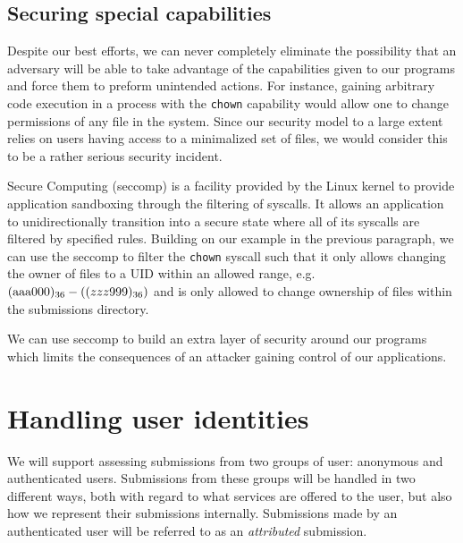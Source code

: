 \subsection{Securing special capabilities}
Despite our best efforts, we can never completely eliminate the
possibility that an adversary will be able to take advantage of the
capabilities given to our programs and force them to preform
unintended actions. For instance, gaining arbitrary code execution in
a process with the \texttt{chown} capability would allow one to change
permissions of any file in the system. Since our security model to a
large extent relies on users having access to a minimalized set of
files, we would consider this to be a rather serious security
incident.

Secure Computing (seccomp) \cite{seccomp2} is a facility provided by
the Linux kernel to provide application sandboxing through the
filtering of syscalls. It allows an application to unidirectionally
transition into a secure state where all of its syscalls are filtered
by specified rules. Building on our example in the previous paragraph,
we can use the seccomp to filter the \texttt{chown} syscall such that
it only allows changing the owner of files to a UID within an allowed
range, e.g. $(\text{aaa000})_{36} - (\text(zzz999)_{36})$ and is only
allowed to change ownership of files within the submissions directory.

We can use seccomp to build an extra layer of security around our
programs which limits the consequences of an attacker gaining control
of our applications.



\section{Handling user identities}
We will support assessing submissions from two groups of user:
anonymous and authenticated users. Submissions from these groups will
be handled in two different ways, both with regard to what services
are offered to the user, but also how we represent their submissions
internally. Submissions made by an authenticated user will be referred
to as an \textit{attributed} submission.

